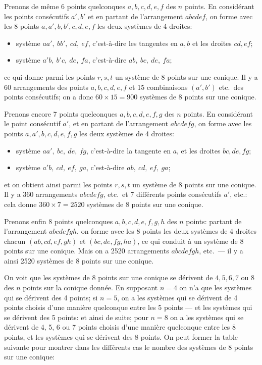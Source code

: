 \documentclass[11pt]{article}
\begin{document}
Prenons de m\^eme 6 points quelconques $a, b, c, d, e, f$ des $n$ points. En consid\'erant les points cons\'ecutifs $a', b'$ et en partant de l'arrangement $abcdef$, on forme avec les 8 points $a, a', b, b', c, d, e, f$ les deux syst\`emes de 4 droites:
\begin{itemize}
\item syst\`eme $aa',\ bb',\ cd,\ ef$, c'est-\`a-dire les tangentes en $a, b$ et les droites $cd, ef$;
\item syst\`eme $a'b,\ b'c,\ de,\ fa$, c'est-\`a-dire $ab,\ bc,\ de,\ fa$;
\end{itemize}
ce qui donne parmi les points $r, s, t$ un syst\`eme de 8 points sur une conique. Il y a 60 arrangements des points $a, b, c, d, e, f$ et 15 combinaisons $(a', b')$ etc.\ des points cons\'ecutifs; on a donc $60 \times 15 = 900$ syst\`emes de 8 points sur une conique.

Prenons encore 7 points quelconques $a, b, c, d, e, f, g$ des $n$ points. En consid\'erant le point cons\'ecutif $a'$, et en partant de l'arrangement $abcdefg$, on forme avec les points $a, a', b, c, d, e, f, g$ les deux syst\`emes de 4 droites:
\begin{itemize}
\item syst\`eme $aa',\ bc,\ de,\ fg$, c'est-\`a-dire la tangente en $a$, et les droites $bc, de, fg$;
\item syst\`eme $a'b,\ cd,\ ef,\ ga$, c'est-\`a-dire $ab,\ cd,\ ef,\ ga$;
\end{itemize}
et on obtient ainsi parmi les points $r, s, t$ un syst\`eme de 8 points sur une conique. Il y a 360 arrangements $abcdefg$, etc.\ et 7 diff\'erents points cons\'ecutifs $a'$, etc.: cela donne $360 \times 7 = 2520$ syst\`emes de 8 points sur une conique.

Prenons enfin 8 points quelconques $a, b, c, d, e, f, g, h$ des $n$ points: partant de l'arrangement $abcdefgh$, on forme avec les 8 points les deux syst\`emes de 4 droites chacun $(ab, cd, ef, gh)$ et $(bc, de, fg, ha)$, ce qui conduit \`a un syst\`eme de 8 points sur une conique. Mais on a 2520 arrangements $abcdefgh$, etc.\ --- il y a ainsi 2520 syst\`emes de 8 points sur une conique.

On voit que les syst\`emes de 8 points sur une conique se d\'erivent de $4, 5, 6, 7$ ou 8 des $n$ points sur la conique donn\'ee. En supposant $n = 4$ on n'a que les syst\`emes qui se d\'erivent des 4 points; si $n = 5$, on a les syst\`emes qui se d\'erivent de 4 points choisis d'une mani\`ere quelconque entre les 5 points --- et les syst\`emes qui se d\'erivent des 5 points: et ainsi de suite; pour $n = 8$ on a les syst\`emes qui se d\'erivent de 4, 5, 6 ou 7 points choisis d'une mani\`ere quelconque entre les 8 points, et les syst\`emes qui se d\'erivent des 8 points. On peut former la table suivante pour montrer dans les diff\'erents cas le nombre des syst\`emes de 8 points sur une conique:
\end{document}
